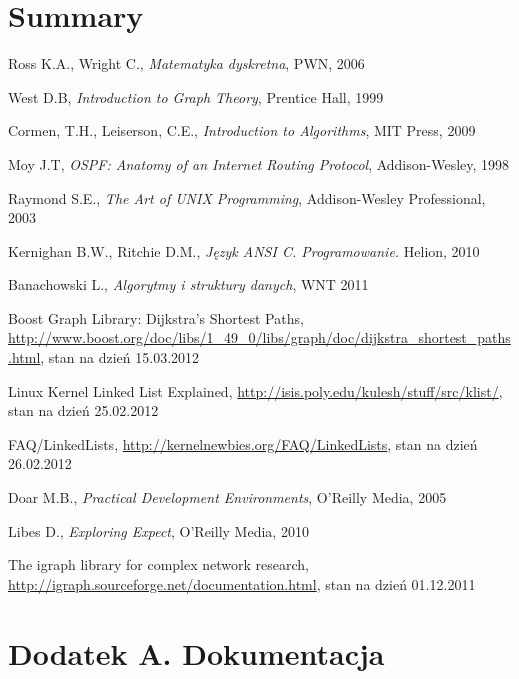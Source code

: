 \documentclass[a4paper,12pt,polish,oneside,openright]{thesis}
\begin{document}
\chapter*{Summary}


\begin{thebibliography}{19}
Ross K.A., Wright C., \emph{Matematyka dyskretna}, PWN, 2006

West D.B, \emph{Introduction to Graph Theory}, Prentice Hall, 1999

Cormen, T.H., Leiserson, C.E., \emph{Introduction to Algorithms}, MIT Press, 2009

Moy J.T, \emph{OSPF: Anatomy of an Internet Routing Protocol}, Addison-Wesley, 1998

Raymond S.E., \emph{The Art of UNIX Programming}, Addison-Wesley Professional, 2003

Kernighan B.W., Ritchie D.M., \emph{Język ANSI C. Programowanie.} Helion, 2010

Banachowski L., \emph{Algorytmy i struktury danych}, WNT 2011

Boost Graph Library: Dijkstra's Shortest Paths, \url{http://www.boost.org/doc/libs/1_49_0/libs/graph/doc/dijkstra_shortest_paths.html}, stan na dzień 15.03.2012

Linux Kernel Linked List Explained, \url{http://isis.poly.edu/kulesh/stuff/src/klist/}, stan na dzień 25.02.2012

FAQ/LinkedLists, \url{http://kernelnewbies.org/FAQ/LinkedLists}, stan na dzień 26.02.2012

Doar M.B., \emph{Practical Development Environments}, O'Reilly Media, 2005

Libes D., \emph{Exploring Expect}, O'Reilly Media, 2010

The igraph library for complex network research, \url{http://igraph.sourceforge.net/documentation.html}, stan na dzień 01.12.2011

\end{thebibliography}



\chapter*{Dodatek A. Dokumentacja}
\end{document}
